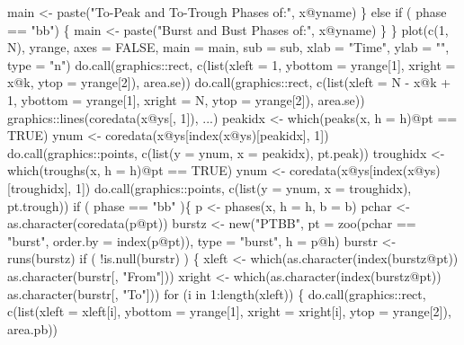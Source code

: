 \documentclass[a4paper]{article}
\begin{document}
                    main <- paste("To-Peak and To-Trough Phases of:", x@yname)
                \}
                else if ( phase == "bb") \{
                    main <- paste("Burst and Bust Phases of:", x@yname)
                \}
            \}
            plot(c(1, N), yrange, axes = FALSE,
                 main = main, sub = sub,
                 xlab = "Time", ylab = "", type = "n")
            do.call(graphics::rect, c(list(xleft = 1,
                                           ybottom = yrange[1],
                                           xright = x@k,
                                           ytop = yrange[2]),
                                      area.se))
            do.call(graphics::rect, c(list(xleft = N - x@k + 1,
                                           ybottom = yrange[1],
                                           xright = N,
                                           ytop = yrange[2]),
                                      area.se))
            graphics::lines(coredata(x@ys[, 1]), ...)
            peakidx <- which(peaks(x, h = h)@pt == TRUE)
            ynum <- coredata(x@ys[index(x@ys)[peakidx], 1])
            do.call(graphics::points, c(list(y = ynum, x = peakidx),
                                        pt.peak))
            troughidx <- which(troughs(x, h = h)@pt == TRUE)
            ynum <- coredata(x@ys[index(x@ys)[troughidx], 1])
            do.call(graphics::points, c(list(y = ynum, x = troughidx),
                                        pt.trough))
            if ( phase  == "bb" )\{
                p <- phases(x, h = h, b = b)
                pchar <- as.character(coredata(p@pt))
                burstz <- new("PTBB",
                              pt = zoo(pchar == "burst",
                                       order.by = index(p@pt)),
                              type = "burst",
                              h = p@h)
                burstr <- runs(burstz)
                if ( !is.null(burstr) ) \{
                    xleft <- which(as.character(index(burstz@pt)) %
                                   as.character(burstr[, "From"]))
                    xright <- which(as.character(index(burstz@pt)) %
                                    as.character(burstr[, "To"]))
                    for (i in 1:length(xleft)) \{
                        do.call(graphics::rect, c(list(xleft = xleft[i],
                                                       ybottom = yrange[1],
                                                       xright = xright[i],
                                                       ytop = yrange[2]),
                                                  area.pb))
\end{document}
